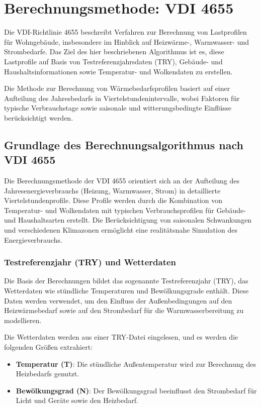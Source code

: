 \section{Berechnungsmethode: VDI 4655}
\label{sec:vdi4655}

Die VDI-Richtlinie 4655 beschreibt Verfahren zur Berechnung von Lastprofilen für Wohngebäude, insbesondere im Hinblick auf Heizwärme-, Warmwasser- und Strombedarfe. Das Ziel des hier beschriebenen Algorithmus ist es, diese Lastprofile auf Basis von Testreferenzjahrsdaten (TRY), Gebäude- und Haushaltsinformationen sowie Temperatur- und Wolkendaten zu erstellen.

Die Methode zur Berechnung von Wärmebedarfsprofilen basiert auf einer Aufteilung des Jahresbedarfs in Viertelstundenintervalle, wobei Faktoren für typische Verbrauchstage sowie saisonale und witterungsbedingte Einflüsse berücksichtigt werden.

\subsection{Grundlage des Berechnungsalgorithmus nach VDI 4655}

Die Berechnungsmethode der VDI 4655 orientiert sich an der Aufteilung des Jahresenergieverbrauchs (Heizung, Warmwasser, Strom) in detaillierte Viertelstundenprofile. Diese Profile werden durch die Kombination von Temperatur- und Wolkendaten mit typischen Verbrauchsprofilen für Gebäude- und Haushaltsarten erstellt. Die Berücksichtigung von saisonalen Schwankungen und verschiedenen Klimazonen ermöglicht eine realitätsnahe Simulation des Energieverbrauchs.

\subsubsection{Testreferenzjahr (TRY) und Wetterdaten}
Die Basis der Berechnungen bildet das sogenannte Testreferenzjahr (TRY), das Wetterdaten wie stündliche Temperaturen und Bewölkungsgrade enthält. Diese Daten werden verwendet, um den Einfluss der Außenbedingungen auf den Heizwärmebedarf sowie auf den Strombedarf für die Warmwasserbereitung zu modellieren.

Die Wetterdaten werden aus einer TRY-Datei eingelesen, und es werden die folgenden Größen extrahiert:
\begin{itemize}
    \item \textbf{Temperatur (T)}: Die stündliche Außentemperatur wird zur Berechnung des Heizbedarfs genutzt.
    \item \textbf{Bewölkungsgrad (N)}: Der Bewölkungsgrad beeinflusst den Strombedarf für Licht und Geräte sowie den Heizbedarf.
\end{itemize}

